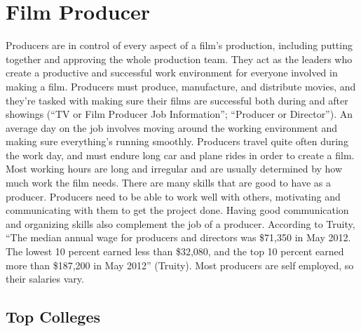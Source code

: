 \chapter{Film Producer}
\begin{multicols}{2}

Producers are in control of every aspect of a film’s production, including putting together and approving the whole production team. They act as the leaders who create a productive and successful work environment for everyone involved in making a film. Producers must produce, manufacture, and distribute movies, and they’re tasked with making sure their films are successful both during and after showings (“TV or Film Producer Job Information”; “Producer or Director”). An average day on the job involves moving around the working environment and making sure everything's running smoothly. Producers travel quite often during the work day, and must endure long car and plane rides in order to create a film. Most working hours are long and irregular and are usually determined by how much work the film needs. There are many skills that are good to have as a producer. Producers need to be able to work well with others, motivating and communicating with them to get the project done. Having good communication and organizing skills also complement the job of a producer. According to Truity, “The median annual wage for producers and directors was \$71,350 in May 2012. The lowest 10 percent earned less than \$32,080, and the top 10 percent earned more than \$187,200 in May 2012” (Truity). Most producers are self employed, so their salaries vary.

\end{multicols}

\section{Top Colleges}

\begin{table}[H]
\centering
\caption{Undergraduate Colleges}
\label{Film Producer Undergraduate Colleges}
\end{table}


